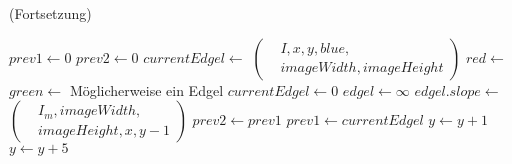\begin{algorithm}[!ht]\small
\caption{ (Fortsetzung)}
\label{alg:findedgelshirzer-2}
	\begin{algorithmic}[1]
			\State $\mathit{prev1} \gets 0$
			\State $\mathit{prev2} \gets 0$
				\State $\mathit{currentEdgel} \gets$ 
				$\left(
				\begin{aligned}
					& I,x,y,\mathit{blue},\\
					& \mathit{imageWidth},\mathit{imageHeight}
				\end{aligned}\right)$
				\label{alg:findedgelshirzer-2-color-start}
				\State $\mathit{red} \gets$ 
				\State $\mathit{green} \gets$ 
				\label{alg:findedgelshirzer-2-color-end}
					\State Möglicherweise ein Edgel
				\Else
					\State $\mathit{currentEdgel} \gets 0$
				\EndIf
				\State $\mathit{edgel} \gets \infty$
				\State {}
				\State $\mathit{edgel.slope} \gets$ 
					$\left(
					\begin{aligned}
						& I_m, \mathit{imageWidth},\\
						& \mathit{imageHeight}, x,y - 1
					\end{aligned}\right)$
				\State {}
				\EndIf
				\State $\mathit{prev2} \gets \mathit{prev1}$
				\State $\mathit{prev1} \gets \mathit{currentEdgel}$
				\State $y \gets y + 1$
			\EndFor
			\State $y \gets y + 5$
		\EndFor
	\end{algorithmic}
\end{algorithm}
